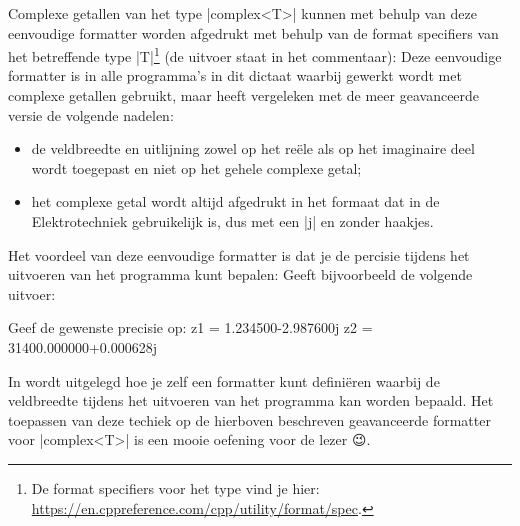 \begin{cpplstShortInline}
Complexe getallen van het type |complex<T>| kunnen met behulp van deze eenvoudige formatter worden afgedrukt met behulp van de format specifiers van het betreffende type |T|\footnote{%
	De format specifiers voor het type  vind je hier: \url{https://en.cppreference.com/cpp/utility/format/spec}.
} (de uitvoer staat in het commentaar):
Deze eenvoudige formatter is in alle programma's in dit dictaat waarbij gewerkt wordt met complexe getallen gebruikt, maar heeft vergeleken met de meer geavanceerde versie de volgende nadelen:
\begin{itemize}
	\item de veldbreedte en uitlijning zowel op het reële als op het imaginaire deel wordt toegepast en niet op het gehele complexe getal;
	\item het complexe getal wordt altijd afgedrukt in het formaat dat in de Elektrotechniek gebruikelijk is, dus met een |j| en zonder haakjes.
\end{itemize}

Het voordeel van deze eenvoudige formatter is dat je de percisie tijdens het uitvoeren van het programma kunt bepalen:
Geeft bijvoorbeeld de volgende uitvoer:
\begin{coutput}
Geef de gewenste precisie op: 
z1 = 1.234500-2.987600j
z2 = 31400.000000+0.000628j
\end{coutput}

In \cite{Collyer2024} wordt uitgelegd hoe je zelf een formatter kunt definiëren waarbij de veldbreedte tijdens het uitvoeren van het programma kan worden bepaald.
Het toepassen van deze techiek op de hierboven beschreven geavanceerde formatter voor |complex<T>| is een mooie oefening voor de lezer 😉.


\end{cpplstShortInline}
